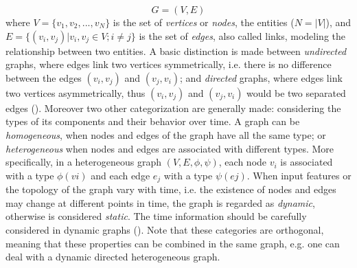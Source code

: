 \documentclass[binding=0.6cm]{sapthesis}
\newcommand{\mycite}[1]{(\cite{#1})}
\begin{document}
\begin{equation}
    \label{eq:bg.gnn.graph-def}
    G = (V,E)
\end{equation}
where $V = \{v_1,v_2,...,v_N\}$ is the set of \textit{vertices} or \textit{nodes}, the entities ($N = |V|$), and $E = \{(v_i,v_j) | v_i,v_j \in V; i \ne j\}$ is the set of \textit{edges}, also called links, modeling the relationship between two entities. A basic distinction is made between \textit{undirected} graphs, where edges link two vertices symmetrically, i.e. there is no difference between the edges $(v_i,v_j)$ and $(v_j,v_i)$; and \textit{directed} graphs, where edges link two vertices asymmetrically, thus $(v_i,v_j)$ and $(v_j,v_i)$ would be two separated edges \mycite{cormen2022introduction}. Moreover two other categorization are generally made: considering the types of its components and their behavior  over time. 
A graph can be \textit{homogeneous}, when nodes and edges of the graph have all the same type; or \textit{heterogeneous} when nodes and edges are associated with different types. More specifically, in a heterogeneous graph $(V, E, \phi, \psi)$, each node $v_i$ is associated with a type $\phi(vi)$ and each edge $e_j$ with a type $\psi(ej)$. 
When input features or the topology of the graph vary with time, i.e. the existence of nodes and edges may change at different points in time, the graph is regarded as \textit{dynamic}, otherwise is considered \textit{static}. The time information should be carefully considered in dynamic graphs \mycite{zhou2021graph,wang2021mthetgnn}. Note that these categories are orthogonal, meaning that these properties can be combined in the same graph, e.g. one can deal with a dynamic directed heterogeneous graph.
\end{document}

